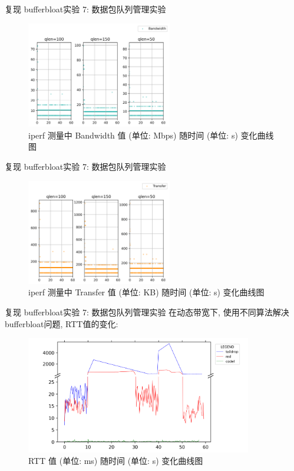 \documentclass{beamer}
\begin{document}
\begin{frame}{复现 bufferbloat}{实验 7: 数据包队列管理实验}
    \begin{figure}[h]
        \centering %
        \includegraphics[width=180pt]{
            ../lab-07-pktq/readme.assets/rp-iperf-bw.png}
        \caption{iperf 测量中 Bandwidth 值
            (单位: Mbps) 随时间 (单位: s) 变化曲线图} %
    \end{figure}
\end{frame}
\begin{frame}{复现 bufferbloat}{实验 7: 数据包队列管理实验}
    \begin{figure}[h]
        \centering %
        \includegraphics[width=180pt]{
            ../lab-07-pktq/readme.assets/rp-iperf-transfer.png}
        \caption{iperf 测量中 Transfer 值
            (单位: KB) 随时间 (单位: s) 变化曲线图} %
    \end{figure}
\end{frame}

\begin{frame}{复现 bufferbloat}{实验 7: 数据包队列管理实验}
    在动态带宽下, 使用不同算法解决bufferbloat问题, RTT值的变化:
    \begin{figure}[h]
        \centering %
        \includegraphics[width=280pt]{
            ../lab-07-pktq/readme.assets/mt-algos-rtt-fig.png}
        \caption{RTT 值 (单位: ms) 随时间 (单位: s) 变化曲线图} %
    \end{figure}
\end{frame}
\end{document}
